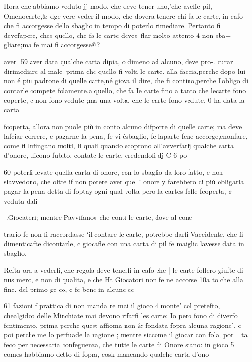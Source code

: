 \documentclass[12pt,a6paper]{article}
\begin{document}
Hora che abbiamo veduto jj
modo, che deve tener uno,'che
aveffe pil, Omenocarte,& dge
vere veder il modo, che dovera tenere chi fa le carte, in cafo
che fi accorgesse dello sbaglio
in tempo di poterlo rimediare.
Pertanto fi devefapere, ches
quello, che fa le carte deve»
flar molto attento 4 non sba=
gliare;ma fe mai fi accorgesse@?

aver
59
aver data qualche carta dipia,
o dimeno ad alcuno, deve pro-.
curar dirimediare al male, prima che quello fi volti le carte.
alla faccia,perche dopo lui-non
é piu padrone di quelle carte,né
giova il dire, che fi contino,perche l’obligo di contarle compete folamente.a quello, che fa Ie
carte fino a tanto che lecarte
fono coperte, e non fono vedute ;ma una volta, che le carte
fono vedute, 0 ha data la carta

fcoperta, allora non puole più 
in conto alcuno difporre di
quelle carte; ma deve lafciar
correre, e pagarne la pena, fe vi
ésbaglio, fe laparte fene accorge,enonfare, come fi lufingano molti, li quali quando
scoprono all’avverfarij qualche
carta d’onore, dicono fubito,
contate le carte, credendofi dj
C 6 po 

 

 

  

60
poterli levate quella carta di
onore, con lo sbaglio da loro
fatto, e non siavvedono, che
oltre if non potere aver quell’
onore y farebbero ci più obligatia pagar la pena detta di foptay
ogni qual volta pero la cartes
fofle fcoperta, ¢ veduta dali

-.Giocatori; mentre Pavvifano»
che conti le carte, dove al cone

trario fe non fi raccordasse ‘il
contare le carte, potrebbe darfi
Vaccidente, che fi dimenticafte
dicontarle, ¢ giocafle con una
carta di pil fe maiglic lavesse
data in sbaglio.

Refta ora a vederfi, che regola deve tenerfi in cafo che |
le carte foflero giufte di nus
mero, e non di qualita, e che Ht
Giocatori non fe ne accorse 10a
to che alla fine. del primo ge
co, ¢ fe bene in alcune ee
 

61
fazioni f prattica di non manda
re mai il gioco 4 monte’ col pretefto, chealgidco delle Minchiate mai devono rifarfi les
carte: Io pero fono di diverfo
fentimento, prima perche quest
affioma non & fondata fopra alcuna ragione’, e poi perche me
lo perfuade la ragione ; mentre
siccome il giocar con fola, por=
ta feco per necessaria confeguenza, che tutte le carte di
Onore siano: in gioco 5 comes
habbiamo detto di fopra, cosk
mancando qualche earta d’ono-~
\end{document}
